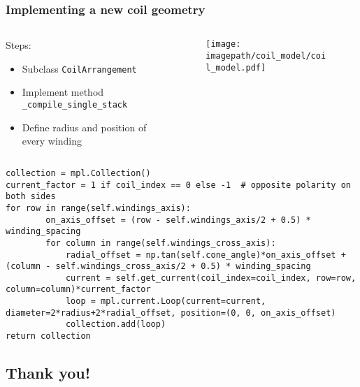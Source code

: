 \begin{frame}[fragile]
    \frametitle{Implementing a new coil geometry}

    \begin{columns}
        \begin{column}{0.5\textwidth}
            {\tiny
                Steps:
                \begin{itemize}
                    \item Subclass \texttt{CoilArrangement}
                    \item Implement method \texttt{\_compile\_single\_stack}
                    \item Define radius and position of every winding
                \end{itemize}
            }
        \end{column}
        \begin{column}{0.48\textwidth}
            \begin{figure}
                \centering
                \texttt{[image: \\imagepath/coil\_model/coil\_model.pdf]}
            \end{figure}
        \end{column}
    \end{columns}
    
    \pause
    \vspace{0.5cm}
    \begin{lstlisting}
collection = mpl.Collection()
current_factor = 1 if coil_index == 0 else -1  # opposite polarity on both sides
for row in range(self.windings_axis):
        on_axis_offset = (row - self.windings_axis/2 + 0.5) * winding_spacing
        for column in range(self.windings_cross_axis):
            radial_offset = np.tan(self.cone_angle)*on_axis_offset + (column - self.windings_cross_axis/2 + 0.5) * winding_spacing
            current = self.get_current(coil_index=coil_index, row=row, column=column)*current_factor
            loop = mpl.current.Loop(current=current, diameter=2*radius+2*radial_offset, position=(0, 0, on_axis_offset)
            collection.add(loop)
return collection
        \end{lstlisting}
\end{frame}


\begin{frame}
    \section*{Thank you!}
\end{frame}


